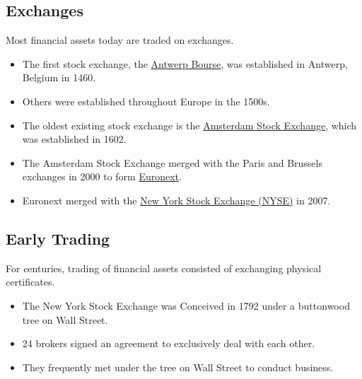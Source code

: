 \documentclass[letterpaper,10pt,english]{sphinxmanual}
\begin{document}
\subsection{Exchanges}
\label{trading:exchanges}
Most financial assets today are traded on exchanges.
\begin{itemize}
\item {} 
The first stock exchange, the \href{http://lat.ms/1jqdmAQ}{Antwerp Bourse}, was established in Antwerp, Belgium in
1460.

\end{itemize}
\begin{itemize}
\item {} 
Others were established throughout Europe in the 1500s.

\end{itemize}
\begin{itemize}
\item {} 
The oldest existing stock exchange is the \href{http://en.wikipedia.org/wiki/Amsterdam\_Stock\_Exchange}{Amsterdam Stock Exchange},
which was established in 1602.

\end{itemize}
\begin{itemize}
\item {} 
The Amsterdam Stock Exchange merged with the Paris and Brussels
exchanges in 2000 to form \href{http://en.wikipedia.org/wiki/Euronext}{Euronext}.

\end{itemize}
\begin{itemize}
\item {} 
Euronext merged with the \href{http://en.wikipedia.org/wiki/New\_York\_Stock\_Exchange}{New York Stock Exchange (NYSE)} in 2007.

\end{itemize}


\subsection{Early Trading}
\label{trading:early-trading}
For centuries, trading of financial assets consisted of exchanging
physical certificates.
\begin{itemize}
\item {} 
The New York Stock Exchange was Conceived in 1792 under a buttonwood
tree on Wall Street.

\end{itemize}
\begin{itemize}
\item {} 
24 brokers signed an agreement to exclusively deal with each other.

\end{itemize}
\begin{itemize}
\item {} 
They frequently met under the tree on Wall Street to conduct
business.

\end{itemize}
\end{document}
